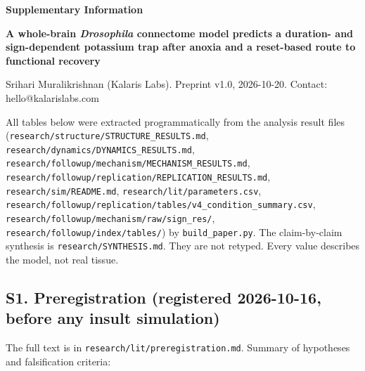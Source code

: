 \documentclass[11pt]{article}
\begin{document}
{\Large\bfseries Supplementary Information\par}\vspace{0.5em}

\textbf{A whole-brain \emph{Drosophila} connectome model predicts a duration- and sign-dependent potassium trap after anoxia and a reset-based route to functional recovery}

Srihari Muralikrishnan (Kalaris Labs). Preprint v1.0, 2026-10-20. Contact: hello@kalarislabs.com

All tables below were extracted programmatically from the analysis result files (\texttt{research/structure/STRUCTURE\_RESULTS.md}, \texttt{research/dynamics/DYNAMICS\_RESULTS.md}, \texttt{research/followup/mechanism/MECHANISM\_RESULTS.md}, \texttt{research/followup/replication/REPLICATION\_RESULTS.md}, \texttt{research/sim/README.md}, \texttt{research/lit/parameters.csv}, \texttt{research/followup/replication/tables/v4\_condition\_summary.csv}, \texttt{research/followup/mechanism/raw/sign\_res/}, \texttt{research/followup/index/tables/}) by \texttt{build\_paper.py}. The claim-by-claim synthesis is \texttt{research/SYNTHESIS.md}. They are not retyped. Every value describes the model, not real tissue.

\subsection{S1. Preregistration (registered 2026-10-16, before any insult simulation)}\label{s1.-preregistration-registered-2026-10-16-before-any-insult-simulation}

The full text is in \texttt{research/lit/preregistration.md}. Summary of hypotheses and falsification criteria:
\end{document}
